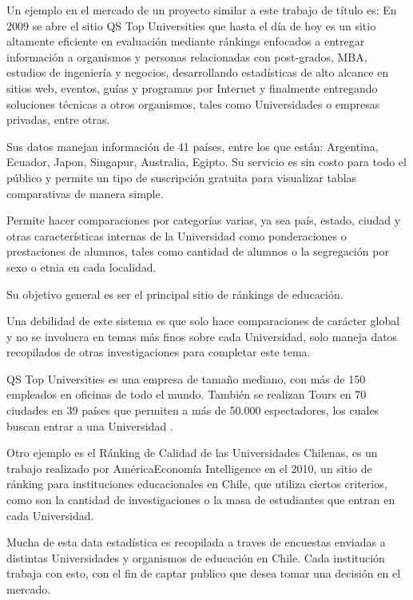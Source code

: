 \documentclass[a4paper,12pt,openany,oneside]{book}
\begin{document}
Un ejemplo en el mercado de un proyecto similar a este trabajo de título es: En 2009 se abre el sitio QS Top Universities que hasta el día de hoy es un sitio altamente eficiente en evaluación mediante ránkings enfocados a entregar información a organismos y personas relacionadas con post-grados, MBA, estudios de ingeniería y negocios, desarrollando estadísticas de alto alcance en sitios web, eventos, guías y programas por Internet y finalmente entregando soluciones técnicas a otros organismos, tales como Universidades o empresas privadas, entre otras.

Sus datos manejan información de 41 países, entre los que están: Argentina, Ecuador, Japon, Singapur, Australia, Egipto. Su servicio es sin costo para todo el público y permite un tipo de suscripción gratuita para visualizar tablas comparativas de manera simple.

Permite hacer comparaciones por categorías varias, ya sea país, estado, ciudad y otras características internas de la Universidad como ponderaciones o prestaciones de alumnos, tales como cantidad de alumnos o la segregación por sexo o etnia en cada localidad.

Su objetivo general es ser el principal sitio de ránkings de educación.

Una debilidad de este sistema es que solo hace comparaciones de carácter global y no se involucra en temas más finos sobre cada Universidad, solo maneja datos recopilados de otras investigaciones para completar este tema.

QS Top Universities es una empresa de tamaño mediano, con más de 150 empleados en oficinas de todo el mundo. También se realizan Tours en 70 ciudades en 39 países que permiten a más de 50.000 espectadores, los cuales buscan entrar a una Universidad  \cite{data2}.

Otro ejemplo es el Ránking de Calidad de las Universidades Chilenas, es un trabajo realizado por AméricaEconomía Intelligence en el 2010, un sitio de ránking para instituciones educacionales en Chile, que utiliza ciertos criterios, como son la cantidad de investigaciones o la masa de estudiantes que entran en cada Universidad.


Mucha de esta data estadística es recopilada a traves de encuestas enviadas a distintas Universidades y organismos de educación en Chile. Cada institución trabaja con esto, con el fin de captar publico que desea tomar una decisión en el mercado.
\end{document}

